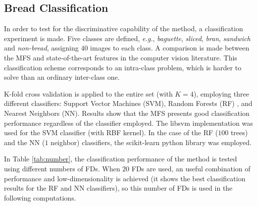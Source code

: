 



\subsection{Bread Classification}
\label{sec:10}

In order to test for the discriminative capability of the method, a classification experiment is made. Five classes are defined, {\em e.g.}, {\em baguette}, {\em sliced}, {\em bran}, {\em sandwich} and {\em non-bread}, assigning $40$ images to each class. A comparison is made between the MFS and state-of-the-art features in the computer vision literature. This classification scheme corresponds to an intra-class problem, which is harder to solve than an ordinary inter-class one. 

K-fold cross validation is applied to the entire set (with $K=4$), employing three different classifiers: Support Vector Machines (SVM), Random Forests (RF) \cite{Breiman2001}, and Nearest Neighbors (NN). Results show that the MFS presents good classification performance regardless of the classifier employed. The \textsf{libsvm} implementation \cite{Chang2011} was used for the SVM classifier (with RBF kernel). In the case of the RF ($100$ trees) and the NN ($1$ neighbor) classifiers, the \textsf{scikit-learn} python library was employed.

In Table \ref{tab:number}, the classification performance of the method is tested using different numbers of FDs. When $20$ FDs are used, an useful combination of performance and low-dimensionality is achieved (it shows the best classification results for the RF and NN classifiers), so this number of FDs is used in the following computations. 

